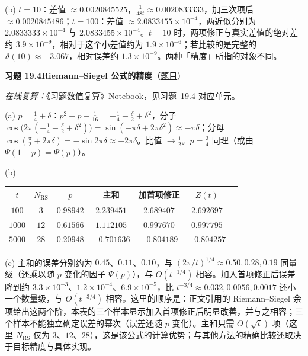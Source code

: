 \documentclass[11pt,a4paper]{article}
\newcommand{\Sol}[2]{%
  \par\addvspace{1.2em}\noindent
  \hypertarget{s:#1}{}\textbf{习题 #1\quad #2}\hfill{\small（\hyperlink{q:#1}{题目}）}\par
  \nopagebreak\smallskip}
\begin{document}
(b) $t=10$：差值 $\approx0.0020845525$，$\frac1{48t}\approx0.0020833333$，加三次项后 $\approx0.0020845486$；$t=100$：差值 $\approx2.0833455\times10^{-4}$，两近似分别为 $2.0833333\times10^{-4}$ 与 $2.0833455\times10^{-4}$。$t=10$ 时，两项修正与真实差值的绝对差约 $3.9\times10^{-9}$，相对于这个小差值约为 $1.9\times10^{-6}$；若比较的是完整的 $\vartheta(10)\approx-3.067$，相对误差约 $1.3\times10^{-9}$。两种「精度」所指的对象不同。

\Sol{19.4}{Riemann--Siegel 公式的精度}
\emph{在线复算：}\href{https://colab.research.google.com/github/lichengtong123/lichengtong-RH/blob/main/\%E4\%B9\%A0\%E9\%A2\%98\%E4\%B8\%8E\%E8\%A7\%A3\%E7\%AD\%94/\%E4\%B9\%A0\%E9\%A2\%98\%E6\%95\%B0\%E5\%80\%BC\%E5\%A4\%8D\%E7\%AE\%97.ipynb}{《习题数值复算》Notebook}，见习题~19.4 对应单元。

(a) $p=\frac14+\delta$：$p^2-p-\frac1{16}=-\frac14-\frac\delta2+\delta^2$，分子 $\cos\bigl(2\pi(-\frac14-\frac\delta2+\delta^2)\bigr)=\sin(-\pi\delta+2\pi\delta^2)\approx-\pi\delta$；分母 $\cos(\frac\pi2+2\pi\delta)=-\sin2\pi\delta\approx-2\pi\delta$。比值 $\to\frac12$。$p=\frac34$ 同理（或由 $\Psi(1-p)=\Psi(p)$）。

(b)
\begin{center}
\small
\begin{tabular}{@{}ccccccc@{}}
\toprule
$t$ & $N_{\mathrm{RS}}$ & $p$ & 主和 & 加首项修正 & $Z(t)$ \\
\midrule
$100$ & $3$ & $0.98942$ & $2.239451$ & $2.689407$ & $2.692697$ \\
$1000$ & $12$ & $0.61566$ & $1.112105$ & $0.997670$ & $0.997795$ \\
$5000$ & $28$ & $0.20948$ & $-0.701636$ & $-0.804189$ & $-0.804257$ \\
\bottomrule
\end{tabular}
\end{center}

(c) 主和的误差分别约为 $0.45$、$0.11$、$0.10$，与 $(2\pi/t)^{1/4}\approx0.50,0.28,0.19$ 同量级（还乘以随 $p$ 变化的因子 $\Psi(p)$），与 $O(t^{-1/4})$ 相容。加入首项修正后误差降到约 $3.3\times10^{-3}$、$1.2\times10^{-4}$、$6.9\times10^{-5}$，比 $t^{-3/4}\approx0.032,0.0056,0.0017$ 还小一个数量级，与 $O(t^{-3/4})$ 相容。这里的顺序是：正文引用的 Riemann--Siegel 余项给出这两个阶，本表的三个样本显示加入首项修正后明显改善，并与之相容；三个样本不能独立确定误差的幂次（误差还随 $p$ 变化）。主和只需 $O(\sqrt t)$ 项（这里 $N_{\mathrm{RS}}$ 仅为 $3$、$12$、$28$），这是该公式的计算优势；与其他方法的精确比较还取决于目标精度与具体实现。
\end{document}
